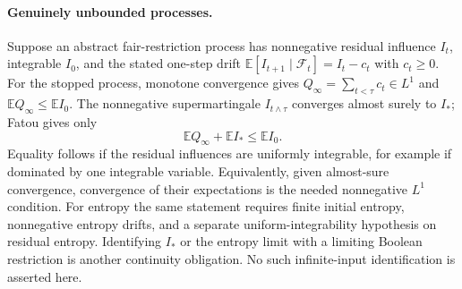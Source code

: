 \documentclass{article}
\begin{document}
\paragraph{Genuinely unbounded processes.}
Suppose an abstract fair-restriction process has nonnegative residual
influence $I_t$, integrable $I_0$, and the stated one-step drift
$\mathbb E[I_{t+1}\mid\mathcal F_t]=I_t-c_t$ with $c_t\ge0$.
For the stopped process, monotone convergence gives
$Q_\infty=\sum_{t<\tau}c_t\in L^1$ and
$\mathbb E Q_\infty\le\mathbb E I_0$.
The nonnegative supermartingale $I_{t\wedge\tau}$ converges almost
surely to $I_*$; Fatou gives only
\[
 \mathbb E Q_\infty+\mathbb E I_*\le\mathbb E I_0.          \tag{5}
\]
Equality follows if the residual influences are uniformly integrable,
for example if dominated by one integrable variable. Equivalently,
given almost-sure convergence, convergence of their expectations is the
needed nonnegative $L^1$ condition. For entropy the same statement
requires finite initial entropy, nonnegative entropy drifts, and a
separate uniform-integrability hypothesis on residual entropy.
Identifying $I_*$ or the entropy limit with a limiting Boolean
restriction is another continuity obligation. No such infinite-input
identification is asserted here.
\end{document}
